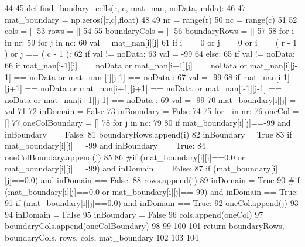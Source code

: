 \begin{DoxyCode}
44 
45 \textcolor{keyword}{def }\hyperlink{namespacesmoderp2d_1_1src_1_1data__preparation_a32f7109b150f5af13b8087e8bb3213d2}{find\_boudary\_cells}(r, c, mat\_nan, noData, mfda):
46 
47   mat\_boundary =  np.zeros([r,c],float)
48 
49   nr = range(r)
50   nc = range(c)
51 
52   cols = []
53   rows = []
54 
55   boundaryCols = []
56   boundaryRows = []
57 
58   \textcolor{keywordflow}{for} i \textcolor{keywordflow}{in} nr:
59     \textcolor{keywordflow}{for} j \textcolor{keywordflow}{in} nc:
60       val = mat\_nan[i][j]
61       \textcolor{keywordflow}{if} i == 0 \textcolor{keywordflow}{or} j == 0 \textcolor{keywordflow}{or} i == ( r - 1 ) \textcolor{keywordflow}{or} j == ( c - 1 ):
62         \textcolor{keywordflow}{if} val != noData:
63           val = -99
64       \textcolor{keywordflow}{else}:
65         \textcolor{keywordflow}{if} val != noData:
66           \textcolor{keywordflow}{if} mat\_nan[i-1][j] == noData \textcolor{keywordflow}{or} mat\_nan[i+1][j] == noData \textcolor{keywordflow}{or} mat\_nan[i][j-1] == noData \textcolor{keywordflow}{or} mat\_nan
      [i][j-1] == noData :
67             val = -99
68           \textcolor{keywordflow}{if} mat\_nan[i-1][j+1] == noData \textcolor{keywordflow}{or} mat\_nan[i+1][j+1] == noData \textcolor{keywordflow}{or} mat\_nan[i-1][j-1] == noData \textcolor{keywordflow}{or} 
      mat\_nan[i+1][j-1] == noData :
69             val = -99
70       mat\_boundary[i][j] = val
71 
72   inDomain = \textcolor{keyword}{False}
73   inBoundary = \textcolor{keyword}{False}
74 
75   \textcolor{keywordflow}{for} i \textcolor{keywordflow}{in} nr:
76     oneCol = []
77     oneColBoundary = []
78     \textcolor{keywordflow}{for} j \textcolor{keywordflow}{in} nc:
79 
80       \textcolor{keywordflow}{if} mat\_boundary[i][j]==-99 \textcolor{keywordflow}{and} inBoundary == \textcolor{keyword}{False}:
81         boundaryRows.append(i)
82         inBoundary = \textcolor{keyword}{True}
83       \textcolor{keywordflow}{if} mat\_boundary[i][j]==-99 \textcolor{keywordflow}{and} inBoundary == \textcolor{keyword}{True}:
84         oneColBoundary.append(j)
85 
86       \textcolor{comment}{#if (mat\_boundary[i][j]==0.0 or mat\_boundary[i][j]==-99) and inDomain == False:
}
87       \textcolor{keywordflow}{if} (mat\_boundary[i][j]==0.0) \textcolor{keywordflow}{and} inDomain == \textcolor{keyword}{False}:
88         rows.append(i)
89         inDomain = \textcolor{keyword}{True}
90       \textcolor{comment}{#if (mat\_boundary[i][j]==0.0 or mat\_boundary[i][j]==-99) and inDomain == True:
}
91       \textcolor{keywordflow}{if} (mat\_boundary[i][j]==0.0) \textcolor{keywordflow}{and} inDomain == \textcolor{keyword}{True}:
92         oneCol.append(j)
93 
94     inDomain = \textcolor{keyword}{False}
95     inBoundary = \textcolor{keyword}{False}
96     cols.append(oneCol)
97     boundaryCols.append(oneColBoundary)
98 
99 
100 
101   \textcolor{keywordflow}{return} boundaryRows, boundaryCols, rows, cols, mat\_boundary
102 
103 
104 

\end{DoxyCode}

